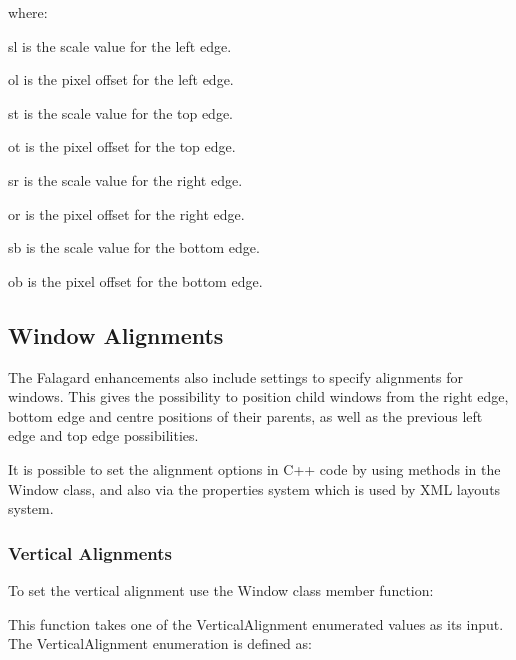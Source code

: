 where\+: \begin{DoxyItemize}
\item {\ttfamily \textquotesingle{}sl\textquotesingle{}} is the scale value for the left edge. \item {\ttfamily \textquotesingle{}ol\textquotesingle{}} is the pixel offset for the left edge. \item {\ttfamily \textquotesingle{}st\textquotesingle{}} is the scale value for the top edge. \item {\ttfamily \textquotesingle{}ot\textquotesingle{}} is the pixel offset for the top edge. \item {\ttfamily \textquotesingle{}sr\textquotesingle{}} is the scale value for the right edge. \item {\ttfamily \textquotesingle{}or\textquotesingle{}} is the pixel offset for the right edge. \item {\ttfamily \textquotesingle{}sb\textquotesingle{}} is the scale value for the bottom edge. \item {\ttfamily \textquotesingle{}ob\textquotesingle{}} is the pixel offset for the bottom edge.\end{DoxyItemize}
\hypertarget{fal_intro_fal_window_alignments}{}\subsection{Window Alignments}\label{fal_intro_fal_window_alignments}
The Falagard enhancements also include settings to specify alignments for windows. This gives the possibility to position child windows from the right edge, bottom edge and centre positions of their parents, as well as the previous left edge and top edge possibilities.

It is possible to set the alignment options in C++ code by using methods in the Window class, and also via the properties system which is used by X\+ML layouts system.\hypertarget{fal_intro_fal_vert_alignments}{}\subsubsection{Vertical Alignments}\label{fal_intro_fal_vert_alignments}
To set the vertical alignment use the Window class member function\+: 
\begin{DoxyCode}{0}
\end{DoxyCode}


This function takes one of the Vertical\+Alignment enumerated values as its input. The Vertical\+Alignment enumeration is defined as\+: 
\begin{DoxyCode}{0}
\DoxyCodeLine{\{}
\DoxyCodeLine{\};}
\end{DoxyCode}



